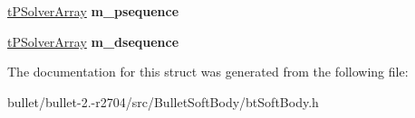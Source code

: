 \begin{DoxyCompactItemize}
\item 
\hypertarget{structbt_soft_body_1_1_config_a48c3acf5e2f871a71cbc846b2ddc7b9d}{\hyperlink{classbt_aligned_object_array}{t\+P\+Solver\+Array} {\bfseries m\+\_\+psequence}}\label{structbt_soft_body_1_1_config_a48c3acf5e2f871a71cbc846b2ddc7b9d}

\item 
\hypertarget{structbt_soft_body_1_1_config_a631da7f0a187b150e30c8fa76e0bfb94}{\hyperlink{classbt_aligned_object_array}{t\+P\+Solver\+Array} {\bfseries m\+\_\+dsequence}}\label{structbt_soft_body_1_1_config_a631da7f0a187b150e30c8fa76e0bfb94}

\end{DoxyCompactItemize}


The documentation for this struct was generated from the following file\+:\begin{DoxyCompactItemize}
\item 
bullet/bullet-\/2.-\/r2704/src/\+Bullet\+Soft\+Body/bt\+Soft\+Body.\+h\end{DoxyCompactItemize}
